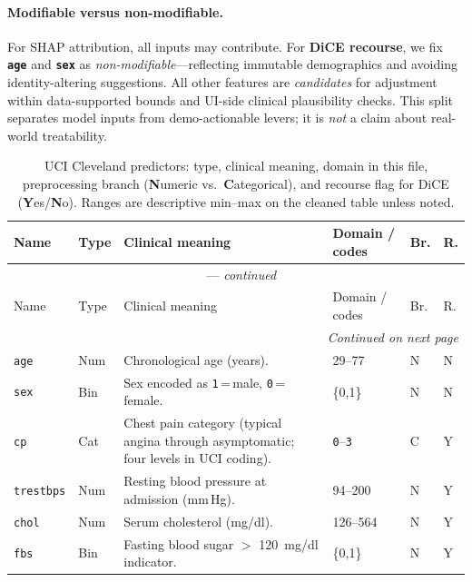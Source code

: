 \documentclass[11pt,a4paper]{article}
\begin{document}
\paragraph{Modifiable versus non-modifiable.}
For SHAP attribution, all inputs may contribute. For \textbf{DiCE recourse}, we fix \textbf{\texttt{age}} and \textbf{\texttt{sex}} as \emph{non-modifiable}—reflecting immutable demographics and avoiding identity-altering suggestions. All other features are \emph{candidates} for adjustment within data-supported bounds and UI-side clinical plausibility checks. This split separates model inputs from demo-actionable levers; it is \emph{not} a claim about real-world treatability.

\setlength{\LTleft}{0pt}
\setlength{\LTright}{0pt}
{\footnotesize
\begin{longtable}{@{}p{1.05cm}p{1.05cm}p{4.05cm}p{2.35cm}p{0.95cm}p{0.85cm}@{}}
  \caption{UCI Cleveland predictors: type, clinical meaning, domain in this file, preprocessing branch (\textbf{N}umeric vs.\ \textbf{C}ategorical), and recourse flag for DiCE (\textbf{Y}es/\textbf{N}o). Ranges are descriptive min--max on the cleaned table unless noted.}%
  \label{tab:feature_taxonomy}\\
  \toprule
  Name & Type & Clinical meaning & Domain / codes & Br. & R. \\
  \midrule
  \endfirsthead
  \multicolumn{6}{c}{\tablename\ \thetable{} --- \textit{continued}}\\
  \toprule
  Name & Type & Clinical meaning & Domain / codes & Br. & R. \\
  \midrule
  \endhead
  \midrule
  \multicolumn{6}{r}{\textit{Continued on next page}}\\
  \endfoot
  \bottomrule
  \endlastfoot
  \texttt{age} & Num & Chronological age (years). & \num{29}--\num{77} & N & N \\
  \texttt{sex} & Bin & Sex encoded as \texttt{1}\,=\,male, \texttt{0}\,=\,female. & \{0,1\} & N & N \\
  \texttt{cp} & Cat & Chest pain category (typical angina through asymptomatic; four levels in UCI coding). & \texttt{0}--\texttt{3} & C & Y \\
  \texttt{trestbps} & Num & Resting blood pressure at admission (mm\,Hg). & \num{94}--\num{200} & N & Y \\
  \texttt{chol} & Num & Serum cholesterol (mg/dl). & \num{126}--\num{564} & N & Y \\
  \texttt{fbs} & Bin & Fasting blood sugar $>$ \SI{120}{mg/dl} indicator. & \{0,1\} & N & Y \\

\end{longtable}}
\end{document}
